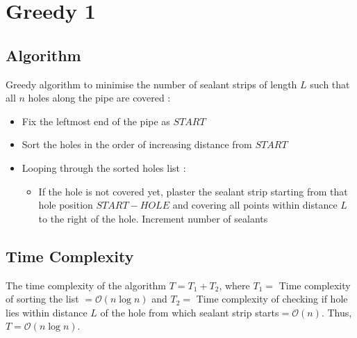 \documentclass[a4paper]{article}
\begin{document}
\section{Greedy 1}
\subsection*{Algorithm}
Greedy algorithm to minimise the number of sealant strips of length $L$ such that all $n$ holes along the pipe are covered :
\begin{itemize}
\item Fix the leftmost end of the pipe as $START$
\item Sort the holes in the order of increasing distance from $START$
\item Looping through the sorted holes list :
\begin{itemize}
\item If the hole is not covered yet, plaster the sealant strip starting from that hole position $START-HOLE$ and covering all points within distance $L$ to the right of the hole. Increment number of sealants
\end{itemize}
\end{itemize}
\subsection*{Time Complexity}
The time complexity of the algorithm $T = T_{1} + T_{2}$, where $T_{1} = $ Time complexity of sorting the list $ = \mathcal{O}(n \log n)$ and $T_{2} = $ Time complexity of checking if hole lies within distance $L$ of the hole from which sealant strip starts$ = \mathcal{O}(n)$. Thus, $T = \mathcal{O}(n \log n)$.
\end{document}
